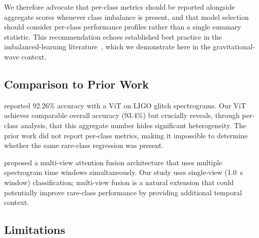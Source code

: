 \documentclass[12pt]{article}
\newcommand{\vitAccuracy}{93.4\%}
\begin{document}
We therefore advocate that per-class metrics should be reported alongside
aggregate scores whenever class imbalance is present, and that model selection
should consider per-class performance profiles rather than a single summary
statistic.
This recommendation echoes established best practice in the imbalanced-learning
literature~\citep{He2009, Buda2018}, which we demonstrate here in the
gravitational-wave context.

\subsection{Comparison to Prior Work}

\citet{Srivastava2025} reported 92.26\% accuracy with a ViT on LIGO glitch
spectrograms.
Our ViT achieves comparable overall accuracy (\vitAccuracy) but crucially
reveals, through per-class analysis, that this aggregate number hides
significant heterogeneity.
The prior work did not report per-class metrics, making it impossible to
determine whether the same rare-class regression was present.

\citet{Wu2024} proposed a multi-view attention fusion architecture that uses
multiple spectrogram time windows simultaneously.
Our study uses single-view (1.0~s window) classification; multi-view fusion
is a natural extension that could potentially improve rare-class performance
by providing additional temporal context.

\subsection{Limitations}
\end{document}
